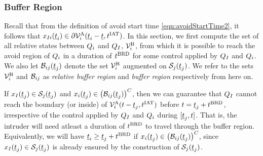 \subsubsection{Buffer Region} \label{sec:buffRegion_case1}
Recall that from the definition of avoid start time \eqref{eqn:avoidStartTime2}, it follows that $x_{I i}(\underline{t}_i) \in \partial \mathcal{V}^{\text{A}}_{i}(\underline{t}_i-\underline{t}, t^\text{IAT})$. In this section, we first compute the set of all relative states between $Q_i$ and $Q_{I}$, $\mathcal{V}^{\text{B}}_{i}$, from which it is possible to reach the avoid region of $Q_i$ in a duration of $t^\text{BRD}$ for some control applied by $Q_{I}$ and $Q_i$. We also let $\mathcal{B}_{ij}(\underline{t}_j)$ denote the set $\mathcal{V}^{\text{B}}_{i}$ augmented on $\mathcal{S}_j(\underline{t}_j)$. We refer to the sets $\mathcal{V}^{\text{B}}_{i}$ and $\mathcal{B}_{ij}$ as \textit{relative buffer region} and \textit{buffer region} respectively from here on.

If $x_{I}(\underline{t}_j) \in \mathcal{S}_j(\underline{t}_j)$ and $x_i(\underline{t}_j) \in \left(\mathcal{B}_{ij}(\underline{t}_j)\right)^C$, then we can guarantee that $Q_{I}$ cannot reach the boundary (or inside) of $\mathcal{V}^{\text{A}}_{i}(t-\underline{t}_j, t^\text{IAT})$ before $t = \underline{t}_j + t^\text{BRD}$, irrespective of the control applied by $Q_{I}$ and $Q_i$ during $[\underline{t}_j, t]$. That is, the intruder will need atleast a duration of $t^\text{BRD}$ to travel through the buffer region. Equivalently, we will have $\underline{t}_i \geq \underline{t}_j + t^\text{BRD}$ if $x_i(\underline{t}_j) \in \left(\mathcal{B}_{ij}(\underline{t}_j)\right)^C$, since $x_{I}(\underline{t}_j) \in \mathcal{S}_j(\underline{t}_j)$ is already ensured by the construction of $\mathcal{S}_j(\underline{t}_j)$.
%
%

